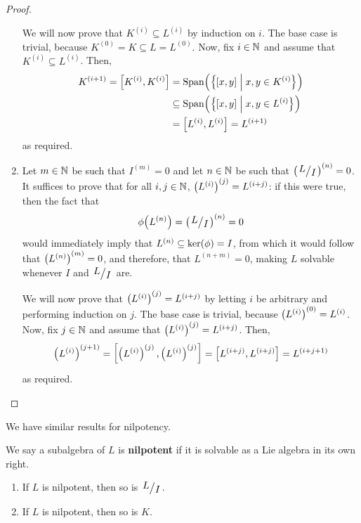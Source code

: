 \begin{proof}
\begin{enumerate}
        We will now prove that $K^{(i)} \subseteq L^{(i)}$ by induction on $i$. The base case is trivial, because $K^{(0)} = K \subseteq L = L^{(0)}$. Now, fix $i \in \mathbb{N}$ and assume that $K^{(i)} \subseteq L^{(i)}$. Then,
        \begin{align*}
            K^{(i + 1)} = \left[ K^{(i)}, K^{(i)} \right]
            &= \operatorname{Span}\!\left( \left\{ \left[ x,y \right] \; \middle\vert \; x, y \in K^{(i)} \right\} \right) \\
            &\subseteq \operatorname{Span}\!\left( \left\{ \left[ x,y \right] \; \middle\vert \; x, y \in L^{(i)} \right\} \right) \\
            &= \left[ L^{(i)}, L^{(i)} \right] = L^{(i + 1)}
        \end{align*}
        as required.

        \item Let $m \in \mathbb{N}$ be such that $I^{(m)} = 0$ and let $n \in \mathbb{N}$ be such that $\parenth{\quotient{L}{I}}^{(n)} = 0$. It suffices to prove that for all $i, j \in \mathbb{N}$, $\left( L^{(i)} \right)^{(j)} = L^{(i + j)}$: if this were true, then the fact that
        \begin{align*}
            \phiof{L^{(n)}} = \parenth{\quotient{L}{I}}^{(n)} = 0
        \end{align*}
        would immediately imply that $L^{(n)} \subseteq \operatorname{ker}\!\left( \phi \right) = I$, from which it would follow that $\left( L^{(n)} \right)^{(m)} = 0$, and therefore, that $L^{(n + m)} = 0$, making $L$ solvable whenever $I$ and $\quotient{L}{I}$ are.

        We will now prove that $\left( L^{(i)} \right)^{(j)} = L^{(i + j)}$ by letting $i$ be arbitrary and performing induction on $j$. The base case is trivial, because $\left( L^{(i)} \right)^{(0)} = L^{(i)}$. Now, fix $j \in \mathbb{N}$ and assume that $\left( L^{(i)} \right)^{(j)} = L^{(i + j)}$. Then,
        \begin{align*}
            \left( L^{(i)} \right)^{(j + 1)} = \left[ \left( L^{(i)} \right)^{(j)}, \left( L^{(i)} \right)^{(j)} \right] = \left[ L^{(i + j)}, L^{(i + j)} \right] = L^{(i + j + 1)}
        \end{align*}
        as required.
    \end{enumerate}
\end{proof}

We have similar results for nilpotency.

\begin{definition}
    We say a subalgebra of $L$ is \textbf{nilpotent} if it is solvable as a Lie algebra in its own right.
\end{definition}

\begin{boxproposition}
    \hfill
    \begin{enumerate}[label = \normalfont\arabic*., noitemsep]
        \item If $L$ is nilpotent, then so is $\quotient{L}{I}$.
        \item If $L$ is nilpotent, then so is $K$.
    \end{enumerate}
\end{boxproposition}

